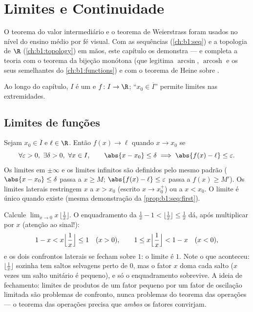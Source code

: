 \chapter{Limites e Continuidade}\label{ch:b1:continuity}

O teorema do valor intermediário e o teorema de Weierstrass foram
usados no nível do ensino médio por fé visual. Com as sequências
(\cref{ch:b1:seq}) e a topologia de $\R$ (\cref{ch:b1:topology})
em mãos, este capítulo os demonstra --- e completa a teoria com
o teorema da bijeção monótona (que legitima $\arcsin$,
$\operatorname{arcosh}$ e os seus semelhantes do \cref{ch:b1:functions})
e com o teorema de Heine sobre .

Ao longo do capítulo, $I$ é um  e $f \colon I \to \R$; ``$x_0 \in
\overline I$'' permite limites nas extremidades.

\section{Limites de funções}

\begin{definition}\label{def:b1:continuity:limit}
Sejam $x_0 \in \overline{I}$ e $\ell \in \R$. Então $f(x) \to \ell$ quando
$x \to x_0$ se
\[
\forall \varepsilon > 0,\ \exists \delta > 0,\ \forall x \in I,
\qquad \abs{x - x_0} \leq \delta \implies \abs{f(x) - \ell} \leq
\varepsilon .
\]
Os limites em $\pm\infty$ e os limites infinitos são definidos pelo mesmo
padrão ($\abs{x - x_0} \leq \delta$ passa a $x \geq M$; $\abs{f(x) -
\ell} \leq \varepsilon$
passa a $f(x) \geq M'$). Os limites laterais
restringem $x$ a $x > x_0$ (escrito $x \to x_0^+$) ou a $x < x_0$. O
limite é único quando existe (mesma demonstração da
\cref{prop:b1:seq:first}).
\end{definition}

\begin{example}\label{ex:b1:continuity:floorlimit}
Calcule $\lim_{x \to 0} x\,\bigl\lfloor \frac1x \bigr\rfloor$.
O enquadramento da  $\frac1x - 1 < \lfloor \frac1x \rfloor \leq
\frac1x$ dá, após multiplicar por $x$ (atenção ao sinal!):
\[
1 - x < x\Bigl\lfloor \frac1x \Bigr\rfloor \leq 1 \quad (x > 0),
\qquad
1 \leq x\Bigl\lfloor \frac1x \Bigr\rfloor < 1 - x \quad (x < 0),
\]
e os dois confrontos laterais se fecham sobre $1$: o limite é $1$. Note
o que aconteceu: $\lfloor \frac1x\rfloor$ sozinha tem saltos selvagens perto de
$0$, mas o fator $x$ doma cada salto ($x$ vezes um salto unitário é
pequeno), e só o enquadramento sobrevive. A ideia de fechamento:
limites de produtos de um fator pequeno por um fator de oscilação
limitada são problemas de confronto, nunca problemas do teorema das
operações --- o teorema das operações precisa que \emph{ambos} os
fatores convirjam.
\end{example}

